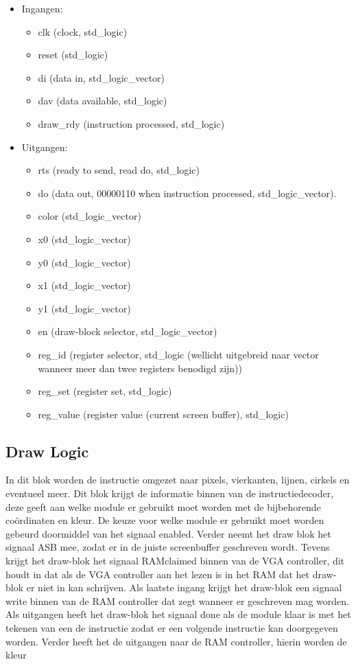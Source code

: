 \begin {itemize}
\item Ingangen:
\begin{itemize}
\item clk (clock, std\_logic)
\item reset (std\_logic)
\item di (data in, std\_logic\_vector)
\item dav (data available, std\_logic)
\item draw\_rdy (instruction processed, std\_logic)
\end{itemize}

\item Uitgangen:
\begin{itemize}
\item rts (ready to send, read do, std\_logic)
\item do (data out, 00000110 when instruction processed, std\_logic\_vector).
\item color (std\_logic\_vector)
\item x0 (std\_logic\_vector)
\item y0 (std\_logic\_vector)
\item x1 (std\_logic\_vector)
\item y1 (std\_logic\_vector)
\item en (draw-block selector, std\_logic\_vector)
\item reg\_id (register selector, std\_logic (wellicht uitgebreid naar vector wanneer meer dan twee registers benodigd zijn))
\item reg\_set (register set, std\_logic)
\item reg\_value (register value (current screen buffer), std\_logic)
\end{itemize}
\end{itemize}

\subsection{Draw Logic}
In dit blok worden de instructie omgezet naar pixels, vierkanten, lijnen, cirkels en eventueel meer. Dit blok krijgt de informatie binnen van de instructiedecoder, deze geeft aan welke module er gebruikt moet worden met de bijbehorende coördinaten en kleur.
De keuze voor welke module er gebruikt moet worden gebeurd doormiddel van het signaal enabled. Verder neemt het draw blok het signaal ASB mee, zodat er in de juiste screenbuffer geschreven wordt. Tevens krijgt het draw-blok het signaal RAMclaimed binnen van de VGA controller, dit houdt in dat als de VGA controller aan het lezen is in het RAM dat het draw-blok er niet in kan schrijven. Als laatste ingang krijgt het draw-blok een signaal write binnen van de RAM controller dat zegt wanneer er geschreven mag worden.
Als uitgangen heeft het draw-blok het signaal done als de module klaar is met het tekenen van een de instructie zodat er een volgende instructie kan doorgegeven worden. Verder heeft het de uitgangen naar de RAM controller, hierin worden de kleur 

